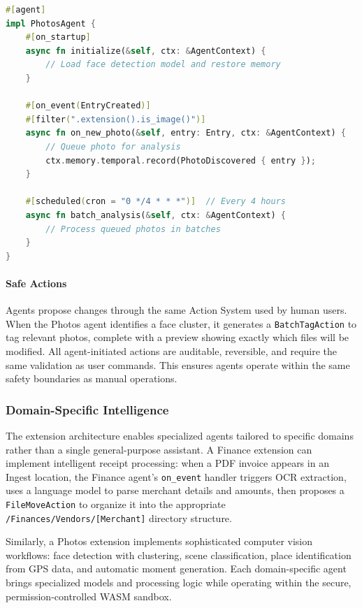 \documentclass[sigconf]{acmart}
\begin{document}
\begin{lstlisting}[language=Rust, caption={Event-driven agent structure using SDK attributes}]
#[agent]
impl PhotosAgent {
    #[on_startup]
    async fn initialize(&self, ctx: &AgentContext) {
        // Load face detection model and restore memory
    }

    #[on_event(EntryCreated)]
    #[filter(".extension().is_image()")]
    async fn on_new_photo(&self, entry: Entry, ctx: &AgentContext) {
        // Queue photo for analysis
        ctx.memory.temporal.record(PhotoDiscovered { entry });
    }

    #[scheduled(cron = "0 */4 * * *")]  // Every 4 hours
    async fn batch_analysis(&self, ctx: &AgentContext) {
        // Process queued photos in batches
    }
}
\end{lstlisting}

\paragraph{Safe Actions}
Agents propose changes through the same Action System used by human users. When the Photos agent identifies a face cluster, it generates a \texttt{BatchTagAction} to tag relevant photos, complete with a preview showing exactly which files will be modified. All agent-initiated actions are auditable, reversible, and require the same validation as user commands. This ensures agents operate within the same safety boundaries as manual operations.

\subsubsection{Domain-Specific Intelligence}

The extension architecture enables specialized agents tailored to specific domains rather than a single general-purpose assistant. A Finance extension can implement intelligent receipt processing: when a PDF invoice appears in an Ingest location, the Finance agent's \texttt{on\_event} handler triggers OCR extraction, uses a language model to parse merchant details and amounts, then proposes a \texttt{FileMoveAction} to organize it into the appropriate \texttt{/Finances/Vendors/[Merchant]} directory structure.

Similarly, a Photos extension implements sophisticated computer vision workflows: face detection with clustering, scene classification, place identification from GPS data, and automatic moment generation. Each domain-specific agent brings specialized models and processing logic while operating within the secure, permission-controlled WASM sandbox.
\end{document}
